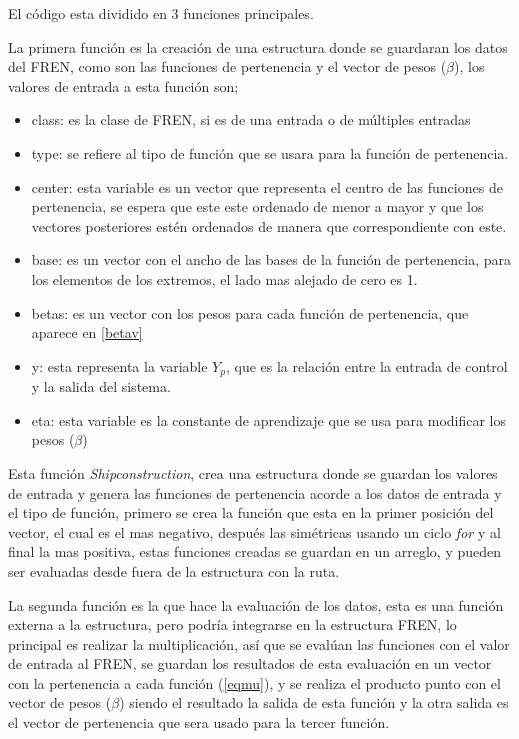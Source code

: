     El código esta dividido en 3 funciones principales.
    
    La primera función es la creación de una estructura donde se guardaran los datos del FREN, como son las funciones de pertenencia y el vector de pesos ($\beta$), los valores de entrada a esta función son; 
   
   \begin{itemize}
   	\item class: es la clase de FREN, si es de una entrada o de múltiples entradas
   	\item type: se refiere al tipo de función que se usara para la función de pertenencia.
   	\item center: esta variable es un vector que representa el centro de las funciones de pertenencia, se espera que este este ordenado de menor a mayor y que los vectores posteriores estén ordenados de manera que correspondiente con este.
   	\item base: es un vector con el ancho de las bases de la función de pertenencia, para los elementos de los extremos, el lado mas alejado de cero es 1.
   	\item betas: es un vector con los pesos para cada función de pertenencia, que aparece en \cref{betav}
   	\item y: esta representa la variable $Y_p$, que es la relación entre la entrada de control y la salida del sistema.
   	\item eta: esta variable es la constante de aprendizaje que se usa para modificar los pesos ($\beta$)
   \end{itemize}
   
   Esta función \textit{Shipconstruction}, crea una estructura donde se guardan los valores de entrada y genera las funciones de pertenencia acorde a los datos de entrada y el tipo de función, primero se crea la función que esta en la primer posición del vector, el cual es el mas negativo, después las simétricas usando un ciclo \textit{for} y al final la mas positiva, estas funciones creadas se guardan en un arreglo, y pueden ser evaluadas desde fuera de la estructura con la ruta.
   
   
   La segunda función es la que hace la evaluación de los datos, esta es una función externa a la estructura, pero podría integrarse en la estructura FREN, lo principal es realizar la multiplicación, así que se evalúan las funciones con el valor de entrada al FREN, se guardan los resultados de esta evaluación en un vector con la pertenencia a cada función (\cref{eqmu}), y se realiza el producto punto con el vector de pesos ($\beta$) siendo el resultado la salida de esta función y la otra salida es el vector de pertenencia que sera usado para la tercer función.
   
